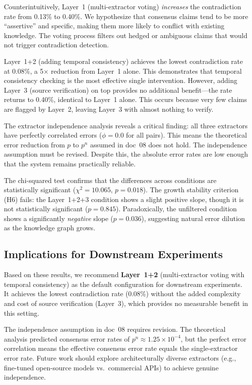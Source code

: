 \documentclass[11pt,a4paper]{article}
\begin{document}
Counterintuitively, Layer~1 (multi-extractor voting) \emph{increases} the contradiction rate from 0.13\% to 0.40\%. We hypothesize that consensus claims tend to be more ``assertive'' and specific, making them more likely to conflict with existing knowledge. The voting process filters out hedged or ambiguous claims that would not trigger contradiction detection.

Layer~1+2 (adding temporal consistency) achieves the lowest contradiction rate at 0.08\%, a 5$\times$ reduction from Layer~1 alone. This demonstrates that temporal consistency checking is the most effective single intervention. However, adding Layer~3 (source verification) on top provides no additional benefit---the rate returns to 0.40\%, identical to Layer~1 alone. This occurs because very few claims are flagged by Layer~2, leaving Layer~3 with almost nothing to verify.

The extractor independence analysis reveals a critical finding: all three extractors have perfectly correlated errors ($\phi = 0.0$ for all pairs). This means the theoretical error reduction from $p$ to $p^n$ assumed in doc~08 does not hold. The independence assumption must be revised. Despite this, the absolute error rates are low enough that the system remains practically reliable.

The chi-squared test confirms that the differences across conditions are statistically significant ($\chi^2 = 10.065$, $p = 0.018$). The growth stability criterion (H6) fails: the Layer~1+2+3 condition shows a slight positive slope, though it is not statistically significant ($p = 0.845$). Paradoxically, the unfiltered condition shows a significantly \emph{negative} slope ($p = 0.036$), suggesting natural error dilution as the knowledge graph grows.

\subsection{Implications for Downstream Experiments}

Based on these results, we recommend \textbf{Layer~1+2} (multi-extractor voting with temporal consistency) as the default configuration for downstream experiments. It achieves the lowest contradiction rate (0.08\%) without the added complexity and cost of source verification (Layer~3), which provides no measurable benefit in this setting.

The independence assumption in doc~08 requires revision. The theoretical analysis predicted consensus error rates of $p^n \approx 1.25 \times 10^{-4}$, but the perfect error correlation means the effective consensus error rate equals the single-extractor error rate. Future work should explore architecturally diverse extractors (e.g., fine-tuned open-source models vs.\ commercial APIs) to achieve genuine independence.
\end{document}
